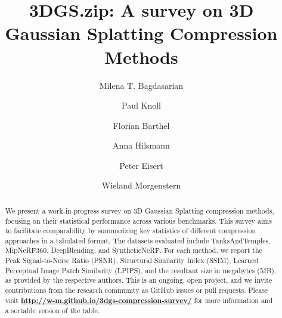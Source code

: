 \documentclass{article}
\title{3DGS.zip: A survey on 3D Gaussian Splatting Compression Methods}
\author[1]{Milena T. Bagdasarian}
\author[1]{Paul Knoll}
\author[1,2]{Florian Barthel}
\author[1]{Anna Hilsmann}
\author[1,2]{Peter Eisert}
\author[1]{Wieland Morgenstern}
\affil[1]{Fraunhofer Heinrich Hertz, HHI}
\affil[2]{Humboldt University of Berlin}
\date{}
\begin{document}
\maketitle

\begin{abstract}

    We present a work-in-progress survey on 3D Gaussian Splatting\cite{kerbl3Dgaussians} compression methods, 
    focusing on their statistical performance across various benchmarks. This survey aims 
    to facilitate comparability by summarizing key statistics of different compression 
    approaches in a tabulated format. The datasets evaluated include TanksAndTemples\cite{TanksAndTemples}, 
    MipNeRF360\cite{MipNeRF360}, DeepBlending\cite{DeepBlending}, and SyntheticNeRF\cite{SyntheticNeRF}. For each method, we report the Peak 
    Signal-to-Noise Ratio (PSNR), Structural Similarity Index (SSIM), Learned Perceptual 
    Image Patch Similarity (LPIPS), and the resultant size in megabytes (MB), as 
    provided by the respective authors.
    This is an ongoing, open project, and we invite contributions from the research community 
    as GitHub issues or pull requests. Please visit \mbox{\bfseries\url{http://w-m.github.io/3dgs-compression-survey/}}
    for more information and a sortable version of the table.
    
\end{abstract}
\end{document}
